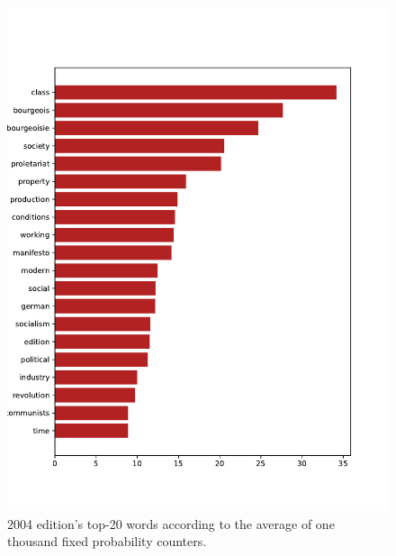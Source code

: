 \begin{figure}[!ht]
    \centering
    \includegraphics[width=0.9\linewidth]{figs/2004.epub-fixed-1000}
    \caption{2004 edition's top-20 words according to the average of one thousand fixed probability counters.}
    \label{fig:2004-20-fixed}
\end{figure}


